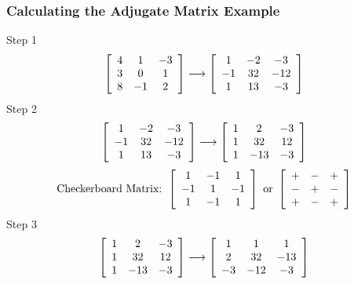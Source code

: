\documentclass[xcolor=dvipsnames]{beamer}
\begin{document}
\begin{frame}
  \frametitle{Calculating the Adjugate Matrix Example}
  \alert{Step 1}
  \begin{equation}
    \label{eq:oyingiej}
    \left[
      \begin{array}{ccc}
        4 & 1 & -3 \\
        3 & 0 & 1 \\
        8 & -1 & 2
      \end{array}\right]\longrightarrow\left[
      \begin{array}{ccc}
        1 & -2 & -3 \\
        -1 & 32 & -12 \\
        1 & 13 & -3
      \end{array}\right]\notag
  \end{equation}
  \alert{Step 2}
  \begin{equation}
    \label{eq:ewezohhu}
    \left[
      \begin{array}{ccc}
        1 & -2 & -3 \\
        -1 & 32 & -12 \\
        1 & 13 & -3
      \end{array}\right]\longrightarrow\left[
      \begin{array}{ccc}
        1 & 2 & -3 \\
        1 & 32 & 12 \\
        1 & -13 & -3
      \end{array}\right]\notag
  \end{equation}
  \begin{equation}
    \label{eq:ooyegeuk}
\mbox{Checkerboard Matrix: }\left[
      \begin{array}{ccc}
        1 & -1 & 1 \\
        -1 & 1 & -1 \\
        1 & -1 & 1
      \end{array}\right]\mbox{ or }\left[
      \begin{array}{ccc}
        + & - & + \\
        - & + & - \\
        + & - & +
      \end{array}\right]\notag
  \end{equation}
  \alert{Step 3}
  \begin{equation}
    \label{eq:oazefako}
    \left[
      \begin{array}{ccc}
        1 & 2 & -3 \\
        1 & 32 & 12 \\
        1 & -13 & -3
      \end{array}\right]\longrightarrow\left[
      \begin{array}{ccc}
        1 & 1 & 1 \\
        2 & 32 & -13 \\
        -3 & -12 & -3
      \end{array}\right]\notag
  \end{equation}
\end{frame}
\end{document}
